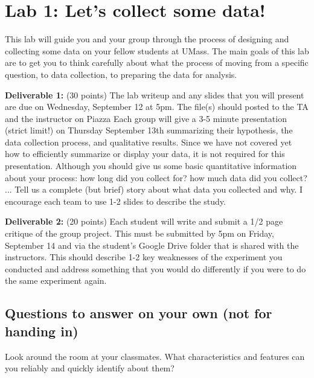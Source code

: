 \documentclass{article}\usepackage[]{graphicx}\usepackage[]{color}
\begin{document}

\section*{Lab 1: Let's collect some data!}

This lab will guide you and your group through the process of designing and collecting some data on your fellow students at UMass. The main goals of this lab are to get you to think carefully about what the process of moving from a specific question, to data collection, to preparing the data for analysis.

{\bf Deliverable 1:}
(30 points) The lab writeup and any slides that you will present are due on Wednesday, September 12 at 5pm. The file(s) should posted to the TA and the instructor on Piazza Each group will give a 3-5 minute presentation (strict limit!) on Thursday September 13th summarizing their hypothesis, the data collection process, and qualitative results. Since we have not covered yet how to efficiently summarize or display your data, it is not required for this presentation. Although you should give us some basic quantitative information about your process: how long did you collect for? how much data did you collect? ... Tell us a complete (but brief) story about what data you collected and why. I encourage each team to use 1-2 slides to describe the study.

{\bf Deliverable 2:} 
(20 points) Each student will write and submit a 1/2 page critique of the group project. This must be submitted by 5pm on Friday, September 14 and via the student's Google Drive folder that is shared with the instructors. This should describe 1-2 key weaknesses of the experiment you conducted and address something that you would do differently if you were to do the same experiment again.

\subsection*{Questions to answer on your own (not for handing in)}

\begin{exercise}
Look around the room at your classmates. What characteristics and features can you reliably and quickly identify about them? 
\end{exercise}
\end{document}

